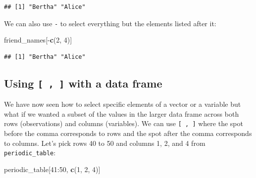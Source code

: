 \documentclass[]{tufte-book}
\newenvironment{Shaded}{\begin{snugshade}}{\end{snugshade}}
\newcommand{\KeywordTok}[1]{\textcolor[rgb]{0.13,0.29,0.53}{\textbf{{#1}}}}
\newcommand{\DecValTok}[1]{\textcolor[rgb]{0.00,0.00,0.81}{{#1}}}
\newcommand{\NormalTok}[1]{{#1}}
\theoremstyle{definition}
\theoremstyle{definition}
\theoremstyle{remark}
\begin{document}
\begin{verbatim}
## [1] "Bertha" "Alice"
\end{verbatim}

We can also use \texttt{-} to select everything but the elements listed
after it:

\begin{Shaded}
\begin{Highlighting}[]
\NormalTok{friend_names[-}\KeywordTok{c}\NormalTok{(}\DecValTok{2}\NormalTok{, }\DecValTok{4}\NormalTok{)]}
\end{Highlighting}
\end{Shaded}

\begin{verbatim}
## [1] "Bertha" "Alice"
\end{verbatim}

\subsection{\texorpdfstring{Using \texttt{{[}\ ,\ {]}} with a data
frame}{Using {[} , {]} with a data frame}}\label{using-with-a-data-frame}

We have now seen how to select specific elements of a vector or a
variable but what if we wanted a subset of the values in the larger data
frame across both rows (observations) and columns (variables). We can
use \texttt{{[}\ ,\ {]}} where the spot before the comma corresponds to
rows and the spot after the comma corresponds to columns. Let's pick
rows 40 to 50 and columns 1, 2, and 4 from \texttt{periodic\_table}:

\begin{Shaded}
\begin{Highlighting}[]
\NormalTok{periodic_table[}\DecValTok{41}\NormalTok{:}\DecValTok{50}\NormalTok{, }\KeywordTok{c}\NormalTok{(}\DecValTok{1}\NormalTok{, }\DecValTok{2}\NormalTok{, }\DecValTok{4}\NormalTok{)]}
\end{Highlighting}
\end{Shaded}
\end{document}
